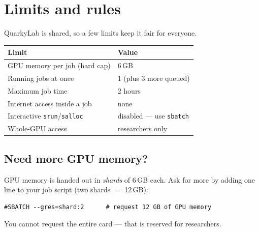 \documentclass[11pt]{article}
\newcommand{\LabName}{QuarkyLab}                       %
\newcommand{\ShardMem}{6\,GB}                          %
\newcommand{\MaxTime}{2 hours}                         %
\newcommand{\MaxRunning}{1}                            %
\newcommand{\MaxQueued}{3}                             %
\newcommand{\code}[1]{\texttt{#1}}
\begin{document}
\section{Limits and rules}
\LabName{} is shared, so a few limits keep it fair for everyone.
\begin{center}
\begin{tabularx}{\linewidth}{@{}X l@{}}
\toprule
\textbf{Limit} & \textbf{Value} \\
\midrule
GPU memory per job (hard cap) & \ShardMem \\
Running jobs at once & \MaxRunning{} (plus \MaxQueued{} more queued) \\
Maximum job time & \MaxTime \\
Internet access inside a job & none \\
Interactive \code{srun}/\code{salloc} & disabled --- use \code{sbatch} \\
Whole-GPU access & researchers only \\
\bottomrule
\end{tabularx}
\end{center}

\subsection{Need more GPU memory?}
GPU memory is handed out in \emph{shards} of \ShardMem{} each. Ask for more by adding one line to your job script (two shards $=$ 12\,GB):
\begin{lstlisting}
#SBATCH --gres=shard:2      # request 12 GB of GPU memory
\end{lstlisting}
You cannot request the entire card --- that is reserved for researchers.

\end{document}
